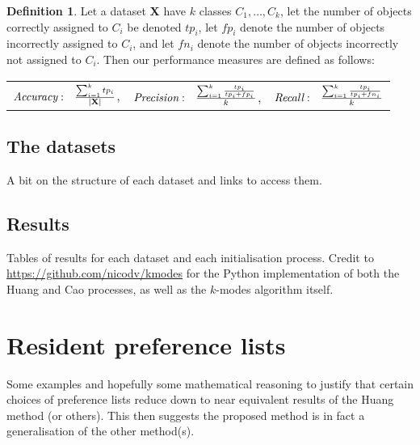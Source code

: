 \documentclass{article}
\theoremstyle{definition}
\newtheorem{definition}{Definition}[section]
\begin{document}
\begin{definition}
	Let a dataset \textbf{X} have $k$ classes $C_1, \ldots, C_k$, let the number of objects correctly assigned to $C_i$ be denoted $tp_i$, let $fp_i$ denote the number of objects incorrectly assigned to $C_i$, and let $fn_i$ denote the number of objects incorrectly not assigned to $C_i$. Then our performance measures are defined as follows: \\
		
		\centering
		\begin{tabular}{ccc}
			$\emph{Accuracy}: \ \ \frac{\sum_{i=1}^{k}{tp_i}}{|\textbf{X}|}$, &
			
			$\emph{Precision}: \ \ \frac{\sum_{i=1}^{k} \frac{tp_i}{tp_i + fp_i}}{k}$, &
			
			$\emph{Recall}: \ \ \frac{\sum_{i=1}^{k} \frac{tp_i}{tp_i + fn_i}}{k}$ \\
		\end{tabular}
\end{definition}


\subsection{The datasets}\label{subsection:datasets}

A bit on the structure of each dataset and links to access them.


\subsection{Results}\label{subsection:results}

Tables of results for each dataset and each initialisation process. Credit to \url{https://github.com/nicodv/kmodes} for the Python implementation of both the Huang and Cao processes, as well as the $k$-modes algorithm itself.

\section{Resident preference lists}\label{section:preferences}

Some examples and hopefully some mathematical reasoning to justify that certain choices of preference lists reduce down to near equivalent results of the Huang method (or others). This then suggests the proposed method is in fact a generalisation of the other method(s).


\printbibliography
\end{document}
